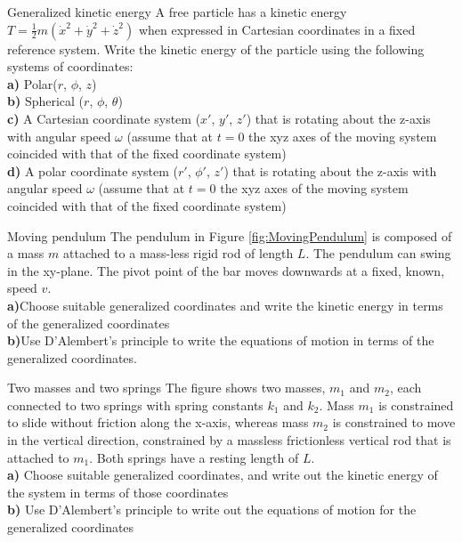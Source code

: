 \begin{problem} {Generalized kinetic energy} A free particle has a kinetic energy $T=\frac{1}{2}m(\dot x^2+\dot y^2+\dot z^2)$ when expressed in Cartesian coordinates in a fixed reference system. Write the kinetic energy of the particle using the following systems of coordinates:\\
\textbf{a)} Polar($r$, $\phi$, $z$)\\
\textbf{b)} Spherical ($r$, $\phi$, $\theta$)\\
\textbf{c)} A Cartesian coordinate system ($x'$, $y'$, $z'$) that is rotating about the z-axis with angular speed $\omega$ (assume that at $t=0$ the xyz axes of the moving system coincided with that of the fixed coordinate system)\\
\textbf{d)} A polar coordinate system ($r'$, $\phi'$, $z'$) that is rotating about the z-axis with angular speed $\omega$ (assume that at $t=0$ the xyz axes of the moving system coincided with that of the fixed coordinate system)
\label{prob_VirtWork_4}
\end{problem}


\begin{problem}{Moving pendulum}
The pendulum in Figure \ref{fig:MovingPendulum} is composed of a mass $m$ attached to a mass-less rigid rod of length $L$. The pendulum can swing in the xy-plane. The pivot point of the bar moves downwards at a fixed, known, speed $v$.
\\
\textbf{a)}Choose suitable generalized coordinates and write the kinetic energy in terms of the generalized coordinates\\
\textbf{b)}Use D'Alembert's principle to write the equations of motion in terms of the generalized coordinates.
\label{prob_VirtWork_5}
\end{problem}

\begin{problem}{Two masses and two springs}
\label{prob_VirtWork_6}
The figure shows two masses, $m_1$ and $m_2$, each connected to two springs with spring constants $k_1$ and $k_2$. Mass $m_1$ is constrained to slide without friction along the x-axis, whereas mass $m_2$ is constrained to move in the vertical direction, constrained by a massless frictionless vertical rod that is attached to $m_1$. Both springs have a resting length of $L$.
\\
\textbf{a)} Choose suitable generalized coordinates, and write out the kinetic energy of the system in terms of those coordinates\\
\textbf{b)} Use D'Alembert's principle to write out the equations of motion for the generalized coordinates
\end{problem}

